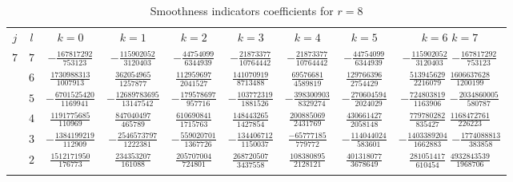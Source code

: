 \begin{table}
  \begin{center}
    \caption{Smoothness indicators coefficients for $r=8$}
    \label{tab:IS_8}
    \begin{tabular}{ccccccccc}
      \toprule
      $j$  &  $l$  &  $k=0$                           &  $k=1$                            &  $k=2$                           &  $k=3$                           &  $k=4$                           &  $k=5$                            &  $k=6$                            $k=7$                           \\ \addlinespace
      $7$  &  $7$  &  $-\frac{  167817292}{ 753123}$  &  $-\frac{  115902052}{ 3120403}$  &  $-\frac{  44754099}{ 6344939}$  &  $-\frac{  21873377}{10764442}$  &  $-\frac{  21873377}{10764442}$  &  $-\frac{  44754099}{ 6344939} $  &  $-\frac{  115902052}{ 3120403}$  $-\frac{  167817292}{ 753123}$  \\ \addlinespace
           &  $6$  &  $ \frac{ 1730988313}{1007913}$  &  $ \frac{  362054965}{ 1257877}$  &  $ \frac{ 112959697}{ 2041527}$  &  $ \frac{ 141070919}{ 8713488}$  &  $ \frac{  69576681}{ 4589819}$  &  $ \frac{ 129766396}{ 2754429} $  &  $ \frac{  513945629}{ 2216079}$  $ \frac{ 1606637628}{1200199}$  \\ \addlinespace
           &  $5$  &  $-\frac{ 6701525420}{1169941}$  &  $-\frac{12689783695}{13147542}$  &  $-\frac{ 179578697}{  957716}$  &  $-\frac{ 103772319}{ 1881526}$  &  $-\frac{ 398300903}{ 8329274}$  &  $-\frac{ 270604594}{ 2024029} $  &  $-\frac{  724803819}{ 1163906}$  $-\frac{ 2034860005}{ 580787}$  \\ \addlinespace
           &  $4$  &  $ \frac{ 1191775685}{ 110969}$  &  $ \frac{  847040497}{  465789}$  &  $ \frac{ 610690841}{ 1715763}$  &  $ \frac{ 148443265}{ 1427854}$  &  $ \frac{ 200885069}{ 2431769}$  &  $ \frac{ 430661427}{ 2058148} $  &  $ \frac{  779780282}{  835427}$  $ \frac{ 1168472761}{ 226223}$  \\ \addlinespace
           &  $3$  &  $-\frac{ 1384199219}{ 112909}$  &  $-\frac{ 2546573797}{ 1222381}$  &  $-\frac{ 559020701}{ 1367726}$  &  $-\frac{ 134406712}{ 1150037}$  &  $ \frac{ -65777185}{  779772}$  &  $-\frac{ 114044024}{  583601} $  &  $-\frac{ 1403389204}{ 1662883}$  $-\frac{ 1774088813}{ 383858}$  \\ \addlinespace
           &  $2$  &  $ \frac{ 1512171950}{ 176773}$  &  $ \frac{  234353207}{  161088}$  &  $ \frac{ 205707004}{  724801}$  &  $ \frac{ 268720507}{ 3437558}$  &  $ \frac{ 108380895}{ 2128121}$  &  $ \frac{ 401318077}{ 3678649} $  &  $ \frac{  281051417}{  610454}$  $ \frac{ 4932843539}{1968706}$  \\ \addlinespace

\end{tabular}
\end{center}
\end{table}
